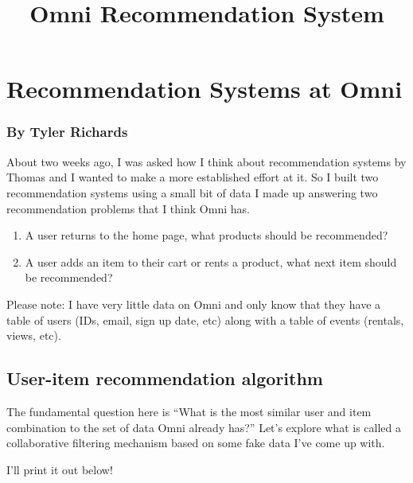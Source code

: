 \documentclass[11pt]{article}
\title{Omni Recommendation System}
\providecommand{\tightlist}{%
      \setlength{\itemsep}{0pt}\setlength{\parskip}{0pt}}
\begin{document}
    
    
    \maketitle
    
    

    
    \hypertarget{recommendation-systems-at-omni}{%
\section{Recommendation Systems at
Omni}\label{recommendation-systems-at-omni}}

\hypertarget{by-tyler-richards}{%
\subsubsection{By Tyler Richards}\label{by-tyler-richards}}

    About two weeks ago, I was asked how I think about recommendation
systems by Thomas and I wanted to make a more established effort at it.
So I built two recommendation systems using a small bit of data I made
up answering two recommendation problems that I think Omni has.

\begin{enumerate}
\def\labelenumi{\arabic{enumi}.}
\tightlist
\item
  A user returns to the home page, what products should be recommended?
\item
  A user adds an item to their cart or rents a product, what next item
  should be recommended?
\end{enumerate}

Please note: I have very little data on Omni and only know that they
have a table of users (IDs, email, sign up date, etc) along with a table
of events (rentals, views, etc).

    \hypertarget{user-item-recommendation-algorithm}{%
\subsection{User-item recommendation
algorithm}\label{user-item-recommendation-algorithm}}

    The fundamental question here is ``What is the most similar user and
item combination to the set of data Omni already has?'' Let's explore
what is called a collaborative filtering mechanism based on some fake
data I've come up with.

I'll print it out below!
\end{document}
